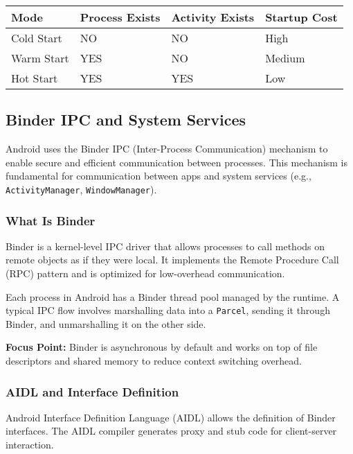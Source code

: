 \documentclass[a4paper,12pt]{article}
\begin{document}
\begin{table}[h!]
\centering
\begin{tabular}{|l|l|l|l|}
\hline
\textbf{Mode} & \textbf{Process Exists} & \textbf{Activity Exists} & \textbf{Startup Cost} \\
\hline
Cold Start & NO & NO & High \\
Warm Start & YES & NO & Medium \\
Hot Start & YES & YES & Low \\

\hline
\end{tabular}
\end{table}

\subsection{Binder IPC and System Services}

Android uses the Binder IPC (Inter-Process Communication) mechanism to enable secure and efficient communication between processes. This mechanism is fundamental for communication between apps and system services (e.g., \texttt{ActivityManager}, \texttt{WindowManager}).

\subsubsection{What Is Binder}

Binder is a kernel-level IPC driver that allows processes to call methods on remote objects as if they were local. It implements the Remote Procedure Call (RPC) pattern and is optimized for low-overhead communication.

Each process in Android has a Binder thread pool managed by the runtime. A typical IPC flow involves marshalling data into a \texttt{Parcel}, sending it through Binder, and unmarshalling it on the other side.

\textbf{Focus Point:} Binder is asynchronous by default and works on top of file descriptors and shared memory to reduce context switching overhead.

\subsubsection{AIDL and Interface Definition}

Android Interface Definition Language (AIDL) allows the definition of Binder interfaces. The AIDL compiler generates proxy and stub code for client-server interaction.
\end{document}
